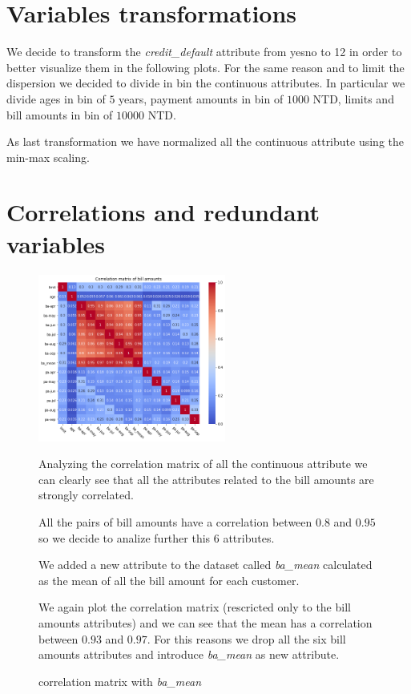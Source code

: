 \section{Variables transformations}

We decide to transform the \textit{credit\_default} attribute from yes\/no to 1\/2 in order to better visualize them in the following plots. For the same reason and to limit the dispersion we decided to divide in bin the continuous attributes. In particular we divide ages in bin of $5$ years, payment amounts in bin of $1000$ NTD, limits and bill amounts in bin of $10000$ NTD.

As last transformation we have normalized all the continuous attribute using the min-max scaling.

\section{Correlations and redundant variables}

\begin{figure}[h]
  \begin{minipage}[h]{.95\textwidth}
  
    \begin{floatingfigure}[r]{0.55\textwidth}
        \mbox{\includegraphics[width=0.55\textwidth]{img/ch2/correlation_matrix_ba}}
        \caption{correlation matrix with \textit{ba\_mean}}
    \end{floatingfigure}

  Analyzing the correlation matrix of all the continuous attribute we can clearly see that all the attributes related to the bill amounts are strongly correlated.

  All the pairs of bill amounts have a correlation between $0.8$ and $0.95$ so we decide to analize further this $6$ attributes.
    
  
  We added a new attribute to the dataset called \textit{ba\_mean} calculated as the mean of all the bill amount for each customer.
  
    
  We again plot the correlation matrix (rescricted only to the bill amounts attributes) and we can see that the mean has a correlation between $0.93$ and $0.97$. For this reasons we drop all the six bill amounts attributes and introduce \textit{ba\_mean} as new attribute. 


    
  \end{minipage}
\end{figure}
